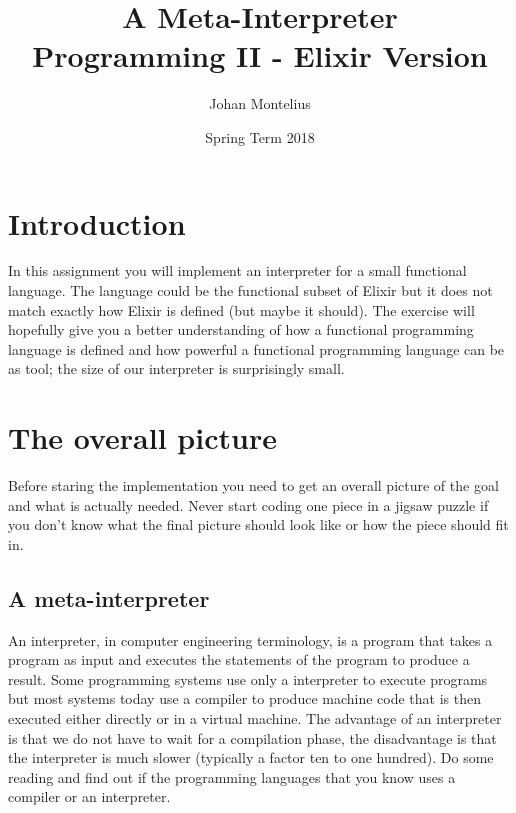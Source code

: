 \documentclass[a4paper,11pt]{article}
\begin{document}

\title{
    \textbf{A Meta-Interpreter}\\
    \large{Programming II - Elixir Version}
}
\author{Johan Montelius}
\date{Spring Term 2018}
\maketitle
\thispagestyle{fancy}



\section*{Introduction}

In this assignment you will implement an interpreter for a small
functional language. The language could be the functional subset of
Elixir but it does not match exactly how Elixir is defined (but maybe
it should). The exercise will hopefully give you a better
understanding of how a functional programming language is defined and
how powerful a functional programming language can be as tool; the
size of our interpreter is surprisingly small. 



\section{The overall picture}

Before staring the implementation you need to get an overall picture
of the goal and what is actually needed. Never start coding one piece
in a jigsaw puzzle if you don't know what the final picture should look
like or how the piece should fit in.

\subsection{A meta-interpreter}
An interpreter, in computer engineering terminology, is a program that
takes a program as input and executes the statements of the program to
produce a result. Some programming systems use only a interpreter to
execute programs but most systems today use a compiler to produce
machine code that is then executed either directly or in a
virtual machine. The advantage of an interpreter is that we do not
have to wait for a compilation phase, the disadvantage is that the
interpreter is much slower (typically a factor ten to one hundred).
Do some reading and find out if the programming languages that you
know uses a compiler or an interpreter.
\end{document}
